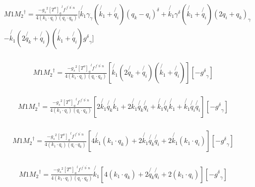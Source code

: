 \begin{equation}
\begin{split}
&M1{M_2}^{\dagger}=\frac{-{g_s}^2 {[T^{o}]_a}^{l} f^{\:f^{\prime}\: b^{\prime}\:n}}{4(k_1 \cdot q_i)(q_i \cdot q_k)}[\not{k_1}{\gamma}_{\gamma}(\not{k_1}+\not{q_i})(q_k-q_i)^{\delta}+\not{k_1}{\gamma}^{\delta}(\not{k_1}+\not{q_i})(2q_i+q_k)_{\gamma}\\
&-\not{k_1}(2\not{q_k}+\not{q_i})(\not{k_1}+\not{q_i}){g^{\delta}}_{\gamma}]\\
\end{split}
\end{equation}

\begin{equation}
\begin{split}
&M1{M_2}^{\dagger}=\frac{-{g_s}^2 {[T^{o}]_a}^{l} f^{\:f^{\prime}\: b^{\prime}\:n}}{4(k_1 \cdot q_i)(q_i \cdot q_k)}[\not{k_1}(2\not{q_k}+\not{q_i})(\not{k_1}+\not{q_i})][-{g^{\delta}}_{\gamma}]\\
\end{split}
\end{equation}

\begin{equation}
\begin{split}
&M1{M_2}^{\dagger}=\frac{-{g_s}^2 {[T^{o}]_a}^{l} f^{\:f^{\prime}\: b^{\prime}\:n}}{4(k_1 \cdot q_i)(q_i \cdot q_k)}
[2\not{k_1}\not{q_k}\not{k_1}+2\not{k_1}\not{q_k}\not{q_i}+\not{k_1}\not{q_i}\not{k_1}+\not{k_1}\not{q_i}\not{q_i}][-{g^{\delta}}_{\gamma}]\\
\end{split}
\end{equation}

\begin{equation}
\begin{split}
&M1{M_2}^{\dagger}=\frac{-{g_s}^2 {[T^{o}]_a}^{l} f^{\:f^{\prime}\: b^{\prime}\:n}}{4(k_1 \cdot q_i)(q_i \cdot q_k)}
[4\not{k_1}(k_1 \cdot q_k)+2\not{k_1}\not{q_k}\not{q_i}+2\not{k_1}(k_1\cdot q_i)][-{g^{\delta}}_{\gamma}]\\
\end{split}
\end{equation}

\begin{equation}
\begin{split}
&M1{M_2}^{\dagger}=\frac{-{g_s}^2 {[T^{o}]_a}^{l} f^{\:f^{\prime}\: b^{\prime}\:n}}{4(k_1 \cdot q_i)(q_i \cdot q_k)}
\not{k_1}[4(k_1 \cdot q_k)+2\not{q_k}\not{q_i}+2(k_1\cdot q_i)][-{g^{\delta}}_{\gamma}]\\
\end{split}
\end{equation}

